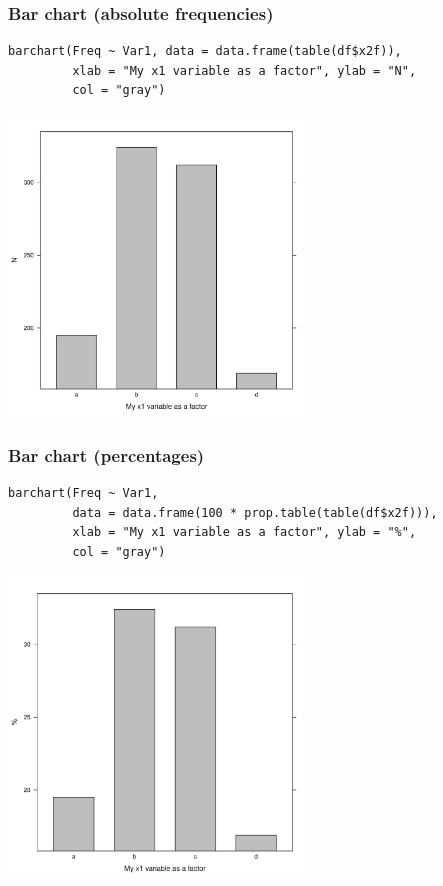 \documentclass[bigger]{beamer}
\begin{document}
\begin{frame}[fragile,shrink = 10]
\frametitle{Bar chart (absolute frequencies)}
\label{sec-2_11}

\lstset{language=R}
\begin{lstlisting}
barchart(Freq ~ Var1, data = data.frame(table(df$x2f)), 
         xlab = "My x1 variable as a factor", ylab = "N",
         col = "gray")
\end{lstlisting}



\includegraphics[width=0.6\textwidth]{../graphs/lattice_barchart_n.pdf}
\end{frame}
\begin{frame}[fragile,shrink = 10]
\frametitle{Bar chart (percentages)}
\label{sec-2_12}

\lstset{language=R}
\begin{lstlisting}
barchart(Freq ~ Var1, 
         data = data.frame(100 * prop.table(table(df$x2f))), 
         xlab = "My x1 variable as a factor", ylab = "%", 
         col = "gray")
\end{lstlisting}



\includegraphics[width=0.6\textwidth]{../graphs/lattice_barchart_p.pdf}
\end{frame}
\end{document}
